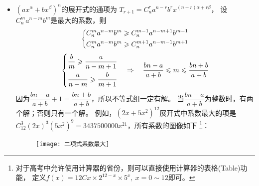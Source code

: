 \begin{itemize}[leftmargin=\inteval{\myitemleftmargin}pt,itemsep=
   \inteval{\myitemitempsep}pt,topsep=\inteval{\myitemtopsep}pt]
\begin{align*}
    m(m-2)\cdot\dfrac{(m-1)^3-(m-1)^{2k+1}}{1-(m-1)^2} \\
    =&\ (m-1)^{2k+1}-(m-1)^3 
\end{align*}
\begin{gather} \label{环形染色-奇数情形}
    a_{2k+1} = (m-1)^{2k+1}-(m-1) 
\end{gather}
\begin{align*}
    a_{2k}-a_2=&\ m(m-2)\sum_{i=2}^{k}(m-1)^{2i-2}=
    m(m-2)\cdot\dfrac{(m-1)^2-(m-1)^{2k}}{1-(m-1)^2} \\
    =&\ (m-1)^{2k}-(m-1)^2 
\end{align*}
\begin{gather} \label{环形染色-偶数情形}
    a_{2k} = (m-1)^{2k}+(m-1) 
\end{gather}
\eqref{环形染色-奇数情形}式和\eqref{环形染色-偶数情形}式可以统一写成
\eqref{环形染色-an统一表达式}式。

上面介绍的上台阶、汉诺塔、错排、环形染色四个问题，如果试图直接寻找答案，无疑是相当困难的，而寻找递推关系则要简单得多。

\item $ \left(ax^{\alpha}+bx^{\beta} \right)^n $的展开式的通项为
$ T_{r+1}=C_n^ra^{n-r}b^rx^{(n-r)\alpha+r\beta} $，
设$ C_n^m a^{n-m}b^m $是最大的系数，则
\begin{align}\label{二项式系数最大值不等式组-首次出现}
\begin{dcases}
    C_n^m a^{n-m}b^m\geq C_n^{m-1} a^{n-m+1}b^{m-1} \\
    C_n^m a^{n-m}b^m\geq C_n^{m+1} a^{n-m-1}b^{m+1}
\end{dcases}
\end{align} 
\begin{align}\label{二项式系数最大值不等式组的解}
    \begin{dcases}
        \dfrac{b}{m}   \geq \dfrac{a}{n-m+1} \\
        \dfrac{a}{n-m} \geq \dfrac{b}{m+1}
    \end{dcases} \quad \Rightarrow \quad 
    \dfrac{bn-a}{a+b} \leq m \leq \dfrac{bn+b}{a+b}
\end{align} 
因为$ \dfrac{bn-a}{a+b}+1=\dfrac{bn+b}{a+b} $，所以不等式组一定有解。
当$ \dfrac{bn-a}{a+b} $为整数时，有两个解；否则只有一个解。
例如，$ (2x+5x^2)^{12} $展开式中系数最大的项是
$ C_{12}^{3}(2x)^3(5x^2)^9=3437500000x^{21} $，所有系数的图像如下
\footnote{对于高考中允许使用计算器的省份，则可以直接使用计算器的表格(Table)功能，
    定义$ f(x)= 12Cx\times 2^{12-x}\times 5^x,\ x=0\sim 12 $即可。}：
\begin{figure}[H]
    \centering
    \texttt{[image: 二项式系数最大]}
\end{figure} 


\end{itemize}
